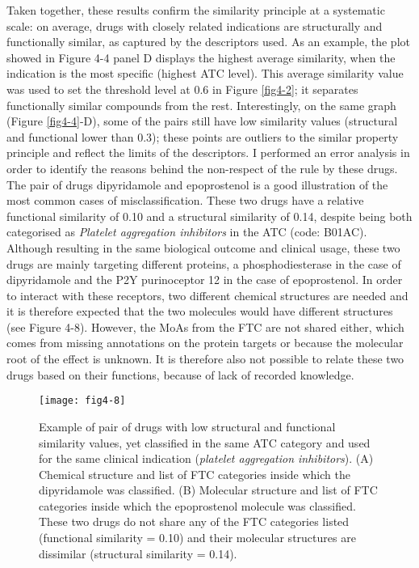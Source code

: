 Taken together, these results confirm the similarity principle at a systematic scale: on average, drugs with closely related indications are structurally and functionally similar, as captured by the descriptors used. As an example, the plot showed in Figure 4-4 panel D displays the highest average similarity, when the indication is the most specific (highest ATC level). This average similarity value was used to set the threshold level at 0.6 in Figure \ref{fig4-2}; it separates functionally similar compounds from the rest. Interestingly, on the same graph (Figure \ref{fig4-4}-D), some of the pairs still have low similarity values (structural and functional lower than 0.3); these points are outliers to the similar property principle and reflect the limits of the descriptors. I performed an error analysis in order to identify the reasons behind the non-respect of the rule by these drugs. The pair of drugs dipyridamole and epoprostenol is a good illustration of the most common cases of misclassification. These two drugs have a relative functional similarity of 0.10 and a structural similarity of 0.14, despite being both categorised as \emph{Platelet aggregation inhibitors} in the ATC (code: B01AC). Although resulting in the same biological outcome and clinical usage, these two drugs are mainly targeting different proteins, a phosphodiesterase in the case of dipyridamole and the P2Y purinoceptor 12 in the case of epoprostenol. In order to interact with these receptors, two different chemical structures are needed and it is therefore expected that the two molecules would have different structures (see Figure 4-8). However, the MoAs from the FTC are not shared either, which comes from missing annotations on the protein targets or because the molecular root of the effect is unknown. It is therefore also not possible to relate these two drugs based on their functions, because of lack of recorded knowledge.

\begin{figure}[H]
    \centering
    \texttt{[image: fig4-8]}
    \caption{Example of pair of drugs with low structural and functional similarity values, yet classified in the same ATC category and used for the same clinical indication (\emph{platelet aggregation inhibitors}). (A) Chemical structure and list of FTC categories inside which the dipyridamole was classified. (B) Molecular structure and list of FTC categories inside which the epoprostenol molecule was classified. These two drugs do not share any of the FTC categories listed (functional similarity = 0.10) and their molecular structures are dissimilar (structural similarity = 0.14).}
    \label{fig4-8}
\end{figure}

